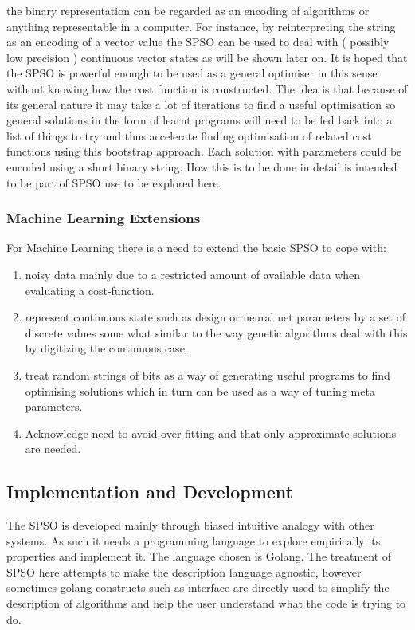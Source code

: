 \documentclass[a4paper,oneside,english]{book}
\numberwithin{equation}{section}
\numberwithin{figure}{section}
\begin{document}
the binary representation can be regarded as an encoding of algorithms or anything representable in a computer. For instance, by reinterpreting the string as an encoding of a vector value the SPSO can be used to deal with  ( possibly low precision ) continuous vector states as will be shown later on. It is hoped that the SPSO is powerful enough to be used as a general optimiser in this sense without knowing how the cost function is constructed. The idea is that because of its general nature it may take a lot of iterations to find a useful optimisation so general solutions in the form of learnt programs will need to be fed back into a list of things to try and thus accelerate finding optimisation of related cost functions using this bootstrap approach. Each solution with parameters could be encoded using a short binary string. How this is to be done in detail is intended to be part of SPSO use to be explored here.

\subsubsection{Machine Learning Extensions }
For  Machine Learning there is a need to extend the basic SPSO to cope with:
\begin{enumerate}
	\item noisy data mainly due to a restricted amount of available data when evaluating a cost-function. 
	\item represent continuous state such as design or neural net parameters by a set of discrete values some what similar to the way genetic algorithms deal with this by digitizing the continuous case.
	\item treat random strings of bits as a way of generating useful programs  to find optimising solutions which in turn can be used as a way of tuning meta parameters.
	\item Acknowledge need to avoid over fitting and that only approximate solutions are needed. 
\end{enumerate}  
\subsection{Implementation and Development}
The SPSO is developed mainly through biased intuitive analogy with  other systems. As such it needs a programming language to explore empirically its properties and implement it. The language chosen is Golang. The treatment of SPSO here attempts to make the description language agnostic, however sometimes golang constructs such as interface are directly used to simplify the description of algorithms and help the user understand what the code is trying to do.  
\end{document}
